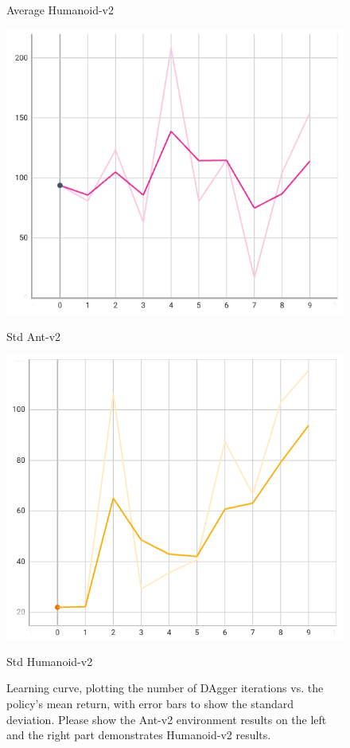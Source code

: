 \documentclass{article}
\begin{document}
\begin{figure}[!h]
\begin{minipage}[b]{0.45\textwidth}
            \caption{Average Humanoid-v2}
            \label{fig:sub2}
        \end{minipage}
        \begin{minipage}[b]{0.45\textwidth}
            \centering
            \includegraphics[width=0.9\linewidth]{hw1/std_ant.png}
            \caption{Std Ant-v2}
            \label{fig:sub1}
        \end{minipage}
        \hfill
        \begin{minipage}[b]{0.45\textwidth}
            \centering
            \includegraphics[width=0.9\linewidth]{hw1/std_humanoid.png}
            \caption{Std Humanoid-v2}
            \label{fig:sub2}
        \end{minipage}
	\caption{Learning curve, plotting the number of DAgger iterations vs. the policy’s mean return, with error bars to show the standard deviation. Please show the Ant-v2 environment results on the left and the right part demonstrates Humanoid-v2 results.}
\end{figure}
\end{document}
